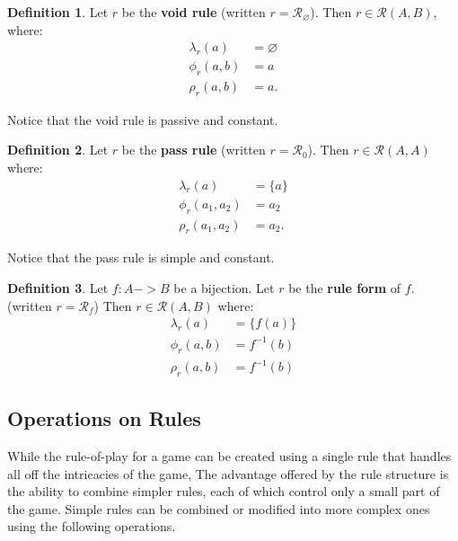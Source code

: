 \documentclass{article}
\theoremstyle{definition}
\newtheorem{definition}{Definition}[subsection]
\theoremstyle{plain}
\def\rule{\mathcal{R}}
\begin{document}
\begin{definition}
  Let $ r $ be the \textbf{void rule}
  (written $ r = \rule_\varnothing $).
  Then $ r \in \rule (A, B) $, where:
  \begin{align}
    \lambda_r (a)    & = \varnothing \\
       \phi_r (a, b) & = a \\
       \rho_r (a, b) & = a.
  \end{align}
\end{definition}

Notice that the void rule is passive and constant.

\begin{definition}
  Let $ r $ be the \textbf{pass rule}
  (written $ r = \rule_0 $).
  Then $ r \in \rule (A, A) $ where:
  \begin{align}
    \lambda_r (a)        & = \{ a \} \\
       \phi_r (a_1, a_2) & =  a_2 \\
       \rho_r (a_1, a_2) & =  a_2.
  \end{align}
\end{definition}

Notice that the pass rule is simple and constant.

\begin{definition}
  Let $ f : A -> B $ be a bijection.
  Let $ r $ be the \textbf{rule form} of $ f $.
  (written $ r = \rule_f $)
  Then $ r \in \rule (A, B) $ where:
  \begin{align}
    \lambda_r (a)    & = \{ f (a) \} \\
       \phi_r (a, b) & = f^{-1} (b) \\
       \rho_r (a, b) & = f^{-1} (b)
  \end{align}
\end{definition}

\subsection{Operations on Rules} %

While the rule-of-play for a game can be created using a single rule
that handles all off the intricacies of the game,
The advantage offered by the rule structure
is the ability to combine simpler rules,
each of which control only a small part of the game.
Simple rules can be combined or modified into more complex ones using the following operations.
\end{document}
